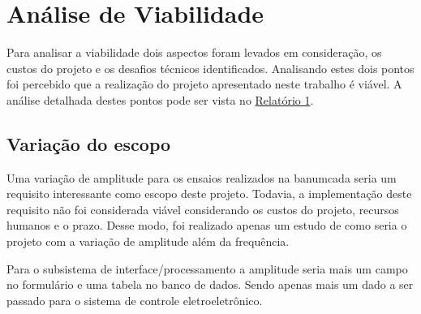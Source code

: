 \chapter{Análise de Viabilidade}

Para analisar a viabilidade dois aspectos foram levados em consideração, os custos do projeto e os desafios técnicos identificados. 
Analisando estes dois pontos foi percebido que a realização do projeto apresentado neste trabalho é viável. A análise detalhada destes pontos 
pode ser vista no \href{https://drive.google.com/file/d/0B5InkGKx6O-MR1B3eVYzZFpjQ3c/view?usp=sharing}{Relatório 1}. 

\section{Variação do escopo}
Uma variação de amplitude para os ensaios realizados na banumcada seria um requisito interessante como escopo deste projeto. Todavia, a
implementação deste requisito não foi considerada viável considerando os custos do projeto, recursos humanos e o prazo. Desse modo, foi
realizado apenas um estudo de como seria o projeto com a variação de amplitude além da frequência. 

Para o subsistema de interface/processamento a amplitude seria mais um campo no formulário e uma tabela no banco de dados.
Sendo apenas mais um dado a ser passado para o sistema de controle eletroeletrônico.







